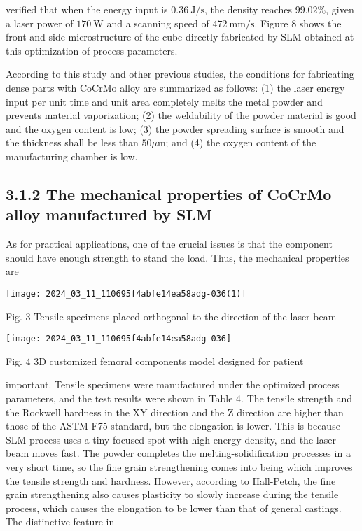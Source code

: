 \documentclass[10pt]{article}
\begin{document}
verified that when the energy input is $0.36 \mathrm{~J} / \mathrm{s}$, the density reaches $99.02 \%$, given a laser power of $170 \mathrm{~W}$ and a scanning speed of $472 \mathrm{~mm} / \mathrm{s}$. Figure 8 shows the front and side microstructure of the cube directly fabricated by SLM obtained at this optimization of process parameters.

According to this study and other previous studies, the conditions for fabricating dense parts with CoCrMo alloy are summarized as follows: (1) the laser energy input per unit time and unit area completely melts the metal powder and prevents material vaporization; (2) the weldability of the powder material is good and the oxygen content is low; (3) the powder spreading surface is smooth and the thickness shall be less than $50 \mu \mathrm{m}$; and (4) the oxygen content of the manufacturing chamber is low.

\subsection*{3.1.2 The mechanical properties of CoCrMo alloy manufactured by SLM}
As for practical applications, one of the crucial issues is that the component should have enough strength to stand the load. Thus, the mechanical properties are

\begin{center}
\texttt{[image: 2024\_03\_11\_110695f4abfe14ea58adg-036(1)]}
\end{center}

Fig. 3 Tensile specimens placed orthogonal to the direction of the laser beam

\begin{center}
\texttt{[image: 2024\_03\_11\_110695f4abfe14ea58adg-036]}
\end{center}

Fig. 4 3D customized femoral components model designed for patient

important. Tensile specimens were manufactured under the optimized process parameters, and the test results were shown in Table 4. The tensile strength and the Rockwell hardness in the $\mathrm{XY}$ direction and the $\mathrm{Z}$ direction are higher than those of the ASTM F75 standard, but the elongation is lower. This is because SLM process uses a tiny focused spot with high energy density, and the laser beam moves fast. The powder completes the melting-solidification processes in a very short time, so the fine grain strengthening comes into being which improves the tensile strength and hardness. However, according to Hall-Petch, the fine grain strengthening also causes plasticity to slowly increase during the tensile process, which causes the elongation to be lower than that of general castings. The distinctive feature in
\end{document}
